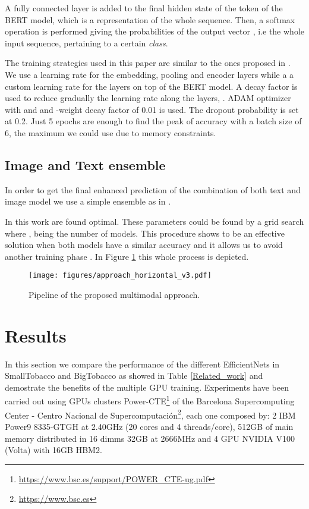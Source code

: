 \documentclass[runningheads]{llncs}
\begin{document}
A fully connected layer is added to the final hidden state of the  token  of the BERT model, which is a representation of the whole sequence. Then, a softmax operation is performed giving  the probabilities of the output vector , i.e the whole input sequence, pertaining to a certain \textit{class}.


The training strategies used in this paper are similar to the ones proposed in \cite{tune_bert,classification_bert}. We use a learning rate  for the embedding, pooling and encoder layers while a a custom learning rate  for the layers on top of the BERT model. A decay factor  is used to reduce gradually the learning rate along the layers, . ADAM optimizer with  and  and -weight decay factor of 0.01 is used. The dropout probability is set at 0.2. Just 5 epochs are enough to find the peak of accuracy with a batch size of 6, the maximum we could use due to memory constraints.

\subsection{Image and Text ensemble}\label{ensemble}

In order to get the final enhanced prediction of the combination of both text and image model we use a simple ensemble as in \cite{stream}.


In this work  are found optimal. These parameters could be found by a grid search where , being  the number of models. This procedure shows to be an effective solution when both models have a similar accuracy and it allows us to avoid another training phase \cite{multimodal}. In Figure \ref{fig:approach} this whole process is depicted.


\begin{figure}[H]
	\begin{centering}
	\texttt{[image: figures/approach\_horizontal\_v3.pdf]}
	\caption{Pipeline of the proposed multimodal approach.}
	\label{fig:approach}
	\end{centering}
\end{figure}

\section{Results}\label{results}

In this section we compare the performance of the different EfficientNets in SmallTobacco and BigTobacco as showed in Table \ref{Related_work} and demostrate the benefits of the multiple GPU training. Experiments have been carried out using GPUs clusters Power-CTE\footnote{\url{https://www.bsc.es/support/POWER_CTE-ug.pdf}} of the Barcelona Supercomputing Center - Centro Nacional de Supercomputación\footnote{\url{https://www.bsc.es}}, each one composed by:
2 IBM Power9 8335-GTGH at 2.40GHz (20 cores and 4 threads/core), 512GB of main memory distributed in 16 dimms  32GB at 2666MHz and 4 GPU NVIDIA V100 (Volta) with 16GB HBM2.
\end{document}
